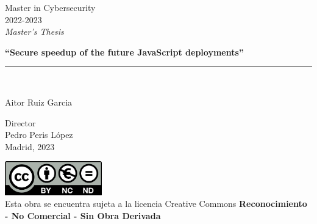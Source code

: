 \documentclass[10pt,journal,compsoc]{IEEEtran}
\begin{document}

\begin{titlepage}
    \begin{sffamily}
        \color{azulUC3M}
        \begin{center}
            \begin{figure}[H] %
            \end{figure}
            \vspace{2.5cm}
            \begin{Large}
                Master in Cybersecurity\\
                2022-2023\\
                \vspace{2cm}
                \textsl{Master's Thesis}
                \bigskip

            \end{Large}
            {\Huge \textbf{``Secure speedup of the future JavaScript deployments''}\\
            \vspace*{0.5cm}
            \rule{10.5cm}{0.1mm}\\
            \vspace*{0.9cm}
            }
            {\LARGE {Aitor Ruiz Garcia}\\
            \vspace*{1cm}
            }
            \begin{Large}
                Director\\
                Pedro Peris López\\
                Madrid, 2023\\
            \end{Large}
        \end{center}
        \vfill
        \color{black}
        \includegraphics[width=4.2cm]{creativecommons.png}\\
        Esta obra se encuentra sujeta a la licencia Creative Commons \textbf{Reconocimiento - No Comercial - Sin Obra Derivada}\\
    \end{sffamily}
\end{titlepage}
\end{document}
